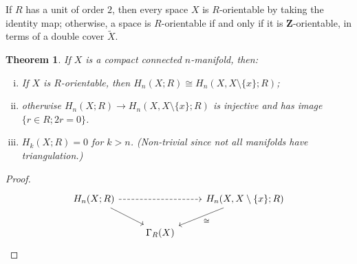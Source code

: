\documentclass[11pt]{article}
\theoremstyle{definition}
\theoremstyle{plain}
\newtheorem{theorem}{Theorem}[section]
\newcommand{\Z}{\mathbf{Z}}
\newcommand{\1}{\mathbf{1}}
\begin{document}
If $R$ has a unit of order $2$, then every space $X$ is $R$-orientable by taking the identity map; otherwise, a space is $R$-orientable if and only if it is $\Z$-orientable, in terms of a double cover $\widetilde{X}$.\medbreak

\begin{theorem}
If $X$ is a compact connected $n$-manifold, then:\begin{enumerate}[(i)]
    \item If $X$ is $R$-orientable, then $H_n(X;R)\cong H_n(X,X\setminus\{x\};R)$;
    \item otherwise $H_n(X;R)\to H_n(X,X\setminus\{x\};R)$ is injective and has image $\{r\in R;2r=0\}$.
    \item $H_k(X;R)=0$ for $k>n$. (Non-trivial since not all manifolds have triangulation.)
\end{enumerate}
\end{theorem}
\begin{proof}
\[\begin{tikzcd}
H_n(X;R)\arrow[dr]\arrow[rr,dashrightarrow]&&H_n(X,X\setminus\{x\};R)\arrow[dl,"\cong"]\\
&\Gamma_R(X)
\end{tikzcd}\]
\end{proof}
\end{document}
